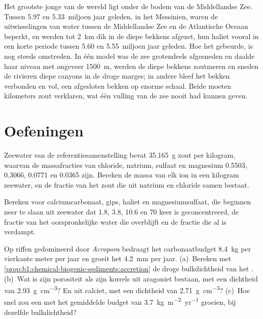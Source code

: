 Het grootste jonge  van de wereld ligt onder de bodem van de Middellandse Zee. Tussen 5.97 en 5.33~miljoen jaar geleden, in het Messinien, waren de uitwisselingen van water tussen de Middellandse Zee en de Atlantische Oceaan beperkt, en werden  tot \qty{2}{km} dik in de diepe bekkens afgezet, hun haliet vooral in een korte periode tussen 5.60 en 5.55~miljoen jaar geleden. Hoe het gebeurde, is nog steeds omstreden. In één model was de zee grotendeels afgesneden en daalde haar niveau met ongeveer \qty{1500}{m}, werden de diepe bekkens zoutmeren en sneden de rivieren diepe canyons in de droge marges; in andere bleef het bekken verbonden en vol, een afgesloten bekken op enorme schaal. Beide moeten kilometers zout verklaren, wat één vulling van de zee nooit had kunnen geven.

\section{Oefeningen}

\begin{exercise}[$\star$]\label{exo:b1:chemical-biogenic-sediments:1}
Zeewater van de referentiesamenstelling bevat \qty{35.165}{g} zout per kilogram, waarvan de massafracties van chloride, natrium, sulfaat en magnesium 0.5503, 0.3066, 0.0771 en 0.0365 zijn. Bereken de massa van elk ion in een kilogram zeewater, en de fractie van het zout die uit natrium en chloride samen bestaat.
\end{exercise}

\begin{exercise}[$\star$]\label{exo:b1:chemical-biogenic-sediments:2}
Bereken voor calciumcarbonaat, gips, haliet en magnesiumsulfaat, die beginnen neer te slaan uit zeewater dat 1.8, 3.8, 10.6 en 70 keer is geconcentreerd, de fractie van het oorspronkelijke water die overblijft en de fractie die al is verdampt.
\end{exercise}

\begin{exercise}[$\star$]\label{exo:b1:chemical-biogenic-sediments:3}
Op riffen gedomineerd door \emph{Acropora} bedraagt het carbonaatbudget \qty{8.4}{kg}  per vierkante meter per jaar en groeit het  \qty{4.2}{mm} per jaar. (a)~Bereken met \cref{prop:b1:chemical-biogenic-sediments:accretion} de droge bulkdichtheid van het . (b)~Wat is zijn porositeit als zijn korrels uit aragoniet bestaan, met een dichtheid van \qty{2.93}{g.cm^{-3}}? En uit calciet, met een dichtheid van \qty{2.71}{g.cm^{-3}}? (c)~Hoe snel zou een  met het gemiddelde budget van \qty{3.7}{kg.m^{-2}.yr^{-1}} groeien, bij dezelfde bulkdichtheid?
\end{exercise}

